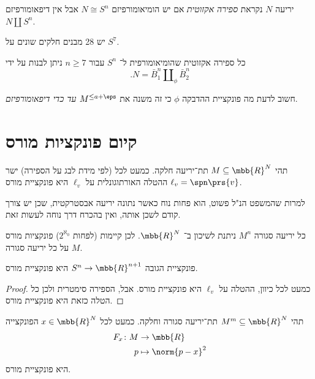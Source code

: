 \documentclass[a4paper,10pt,twoside,openany]{book}
\begin{document}
\begin{definition}
יריעה
$N$
נקראת
\emph{ספירה אקזוטית}
אם יש הומיאומורפיזם
$N \cong S^n$
אבל אין דיפאומורפיזם
$N \amalg S^n$.
\end{definition}

\begin{fact}[מילנור]
יש 28 מבנים חלקים שונים על
$S^7$.
\end{fact}

\begin{fact}
כל ספירה אקזוטית שהומיאומורפית ל־%
$S^n$
עבור
$n \geq 7$
ניתן לבנות על ידי
\[\text{.} N = \bar{B}^n_1 \amalg_\phi \bar{B}_2^n\]
\end{fact}

\begin{remark}
חשוב לדעת מה פונקציית ההדבקה
$\phi$
כי זה משנה את
$M^{\leq a + \eps}$
\emph{עד כדי דיפאומורפיזם}.
\end{remark}

\section{קיום פונקציות מורס}

\begin{theorem}
תהי
$M \subseteq \mbb{R}^N$
תת־יריעה חלקה.
כמעט לכל (לפי מידת לבג על הספירה) ישר
$\ell_v = \spn\prs{v}$
ההטלה האורתוגונלית על
$\ell_v$
היא פונקציית מורס.
\end{theorem}

\begin{remark}
למרות שהמשפט הנ"ל פשוט, הוא פחות נוח כאשר נתונה יריעה אבסטרקטית, שכן יש צורך קודם לשכן אותה, ואין בהכרח דרך נוחה לעשות זאת.
\end{remark}

\begin{corollary}
כל יריעה סגורה
$M^n$
ניתנת לשיכון ב־%
$\mbb{R}^N$.
לכן קיימות
(לפחות
$2^{\aleph_0}$)
פונקציות מורס על כל יריעה סגורה
$M$.
\end{corollary}

\begin{corollary}
פונקציית הגובה
$S^n \to \mbb{R}^{n+1}$
היא פונקציית מורס.
\end{corollary}

\begin{proof}
כמעט לכל כיוון, ההטלה על
$\ell_v$
היא פונקציית מורס. אבל, הספירה סימטרית ולכן כל הטלה כזאת היא פונקציית מורס.
\end{proof}

\begin{theorem}
תהי
$M^m \subseteq \mbb{R}^N$
תת־יריעה סגורה וחלקה. כמעט לכל
$x \in \mbb{R}^N$
הפונקצייה
\begin{align*}
F_x \colon M &\to \mbb{R} \\
p &\mapsto \norm{p-x}^2
\end{align*}
היא פונקציית מורס.
\end{theorem}
\end{document}
